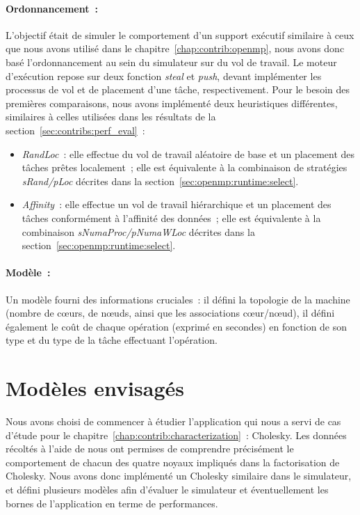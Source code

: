 \paragraph{Ordonnancement~:}
L'objectif était de simuler le comportement d'un support exécutif similaire à ceux que nous avons utilisé dans le chapitre~\ref{chap:contrib:openmp}, nous avons donc basé l'ordonnancement au sein du simulateur sur du vol de travail.
Le moteur d'exécution repose sur deux fonction \emph{steal} et \emph{push}, devant implémenter les processus de vol et de placement d'une tâche, respectivement.
Pour le besoin des premières comparaisons, nous avons implémenté deux heuristiques différentes, similaires à celles utilisées dans les résultats de la section~\ref{sec:contribs:perf_eval}~:
\begin{itemize}
  \item \emph{RandLoc}~: elle effectue du vol de travail aléatoire de base et un placement des tâches prêtes localement~; elle est équivalente à la combinaison de stratégies \emph{sRand/pLoc} décrites dans la section~\ref{sec:openmp:runtime:select}.
  \item \emph{Affinity}~: elle effectue un vol de travail hiérarchique et un placement des tâches conformément à l'affinité des données~; elle est équivalente à la combinaison \emph{sNumaProc/pNumaWLoc} décrites dans la section~\ref{sec:openmp:runtime:select}.
\end{itemize}


\paragraph{Modèle~:}
Un modèle fourni des informations cruciales~: il défini la topologie de la machine (nombre de cœurs, de nœuds, ainsi que les associations cœur/nœud), il défini également le coût de chaque opération (exprimé en secondes) en fonction de son type et du type de la tâche effectuant l'opération.


\section{Modèles envisagés}\label{sec:simulation:modeles}

Nous avons choisi de commencer à étudier l'application qui nous a servi de cas d'étude pour le chapitre~\ref{chap:contrib:characterization}~: Cholesky.
Les données récoltés à l'aide de \outil nous ont permises de comprendre précisément le comportement de chacun des quatre noyaux impliqués dans la factorisation de Cholesky.
Nous avons donc implémenté un Cholesky similaire dans le simulateur, et défini plusieurs modèles afin d'évaluer le simulateur et éventuellement les bornes de l'application en terme de performances.

